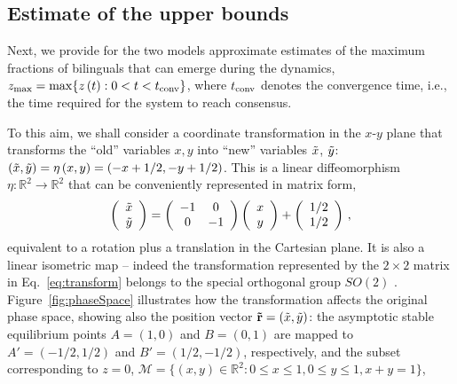 \documentclass[review]{elsarticle}
\newcommand{\zmax}{z_\mathrm{max}}
\newcommand{\tx}{\Tilde{x}}
\newcommand{\ty}{\Tilde{y}}
\newcommand{\tr}{\Tilde{r}}
\newcommand{\LE}{\!\leq\!}
\newcommand{\EQ}{\!=\!}
\newcommand{\IN}{\!\in\!}
\newcommand{\+}{\! + \!}
\begin{document}
\subsection{Estimate of the upper bounds}
\label{bounds}


Next, we provide for the two models approximate estimates of the maximum fractions of bilinguals that can emerge during the dynamics, $\zmax = \max\{ z\left(t\right): 0 <  t < t_{\rm conv} \}$, where $t_{\rm conv}$  denotes the convergence time, i.e., the time required for the system to reach consensus.


To this aim, we shall consider a coordinate transformation in the $x$-$y$ plane that transforms the ``old'' variables $x,y$ into ``new'' variables $\tx$, $\ty$:  $\left(\tx,\ty\right) = \eta\left(x,y \right) = (-x + 1/2,-y + 1/2)$. 
This is a linear diffeomorphism $\eta: \mathbb{R}^{2}\to \mathbb{R}^{2}$ that can be conveniently represented in matrix form,
%
\begin{equation}\label{eq:transform}
    \left(\begin{array}{c} \tx  \\ \ty  \end{array}\right)  = 
    \left(\begin{array}{cc} -1 & 0\\ 0 & -1 \end{array}\right)
    \left(\begin{array}{c} x \\ y \end{array}\right) 
    + \left(\begin{array}{c} 1/2 \\ 1/2 \end{array}\right)  \, ,
\end{equation}
%
equivalent to a  rotation plus a translation in the Cartesian plane.
It is also a linear isometric map -- indeed the transformation represented by the $2 \times 2 $ matrix in Eq.~\eqref{eq:transform} belongs to the special orthogonal group $SO(2)$ \cite{cornwell1997}.
%
Figure~\ref{fig:phaseSpace} illustrates how the transformation affects the original phase space,
showing also the position vector  $\mathbf{\tr}= (\tx,\ty)$:
the asymptotic stable equilibrium points $A = (1,0)$ and $B = (0,1)$ are mapped to $A' = (-1/2,1/2)$ and $B' = (1/2,-1/2)$, respectively, and the subset corresponding to  $z = 0$,
$\mathcal{M} = \{ (x,y) \IN \mathbb{R}^2: 0 \LE  x \leq 1,  0 \LE y \leq 1, x + y \EQ 1 \}$,
\end{document}
